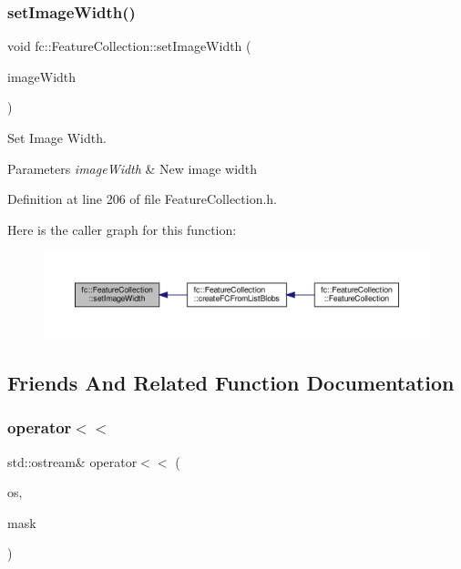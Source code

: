 \subsubsection{\texorpdfstring{set\+Image\+Width()}{setImageWidth()}}
{\footnotesize\ttfamily void fc\+::\+Feature\+Collection\+::set\+Image\+Width (\begin{DoxyParamCaption}\item[{uint32\+\_\+t}]{image\+Width }\end{DoxyParamCaption})\hspace{0.3cm}{\ttfamily [inline]}}



Set Image Width. 


\begin{DoxyParams}{Parameters}
{\em image\+Width} & New image width \\
\hline
\end{DoxyParams}


Definition at line 206 of file Feature\+Collection.\+h.

Here is the caller graph for this function\+:
\nopagebreak
\begin{figure}[H]
\begin{center}
\leavevmode
\includegraphics[width=350pt]{d9/d78/classfc_1_1FeatureCollection_a8442b318f388e4cd5dea8bbfc429c711_icgraph}
\end{center}
\end{figure}


\subsection{Friends And Related Function Documentation}
\mbox{\label{classfc_1_1FeatureCollection_aa9d00b19fc043e3122d92a976e07c54d}} 
\subsubsection{\texorpdfstring{operator$<$$<$}{operator<<}}
{\footnotesize\ttfamily std\+::ostream\& operator$<$$<$ (\begin{DoxyParamCaption}\item[{std\+::ostream \&}]{os,  }\item[{const \hyperlink{classfc_1_1FeatureCollection}{Feature\+Collection} \&}]{mask }\end{DoxyParamCaption})\hspace{0.3cm}{\ttfamily [friend]}}



